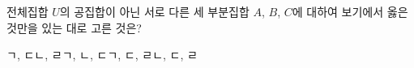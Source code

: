 전체집합 $U$의 공집합이 아닌 서로 다른 세 부분집합 $A$, $B$, $C$에 대하여 보기에서 옳은 것만을 있는 대로 고른 것은? 
\begin{choices32}{ㄱ, ㄷ}{ㄴ, ㄹ}{ㄱ, ㄴ, ㄷ}{ㄱ, ㄷ, ㄹ}{ㄴ, ㄷ, ㄹ}\end{choices32}
